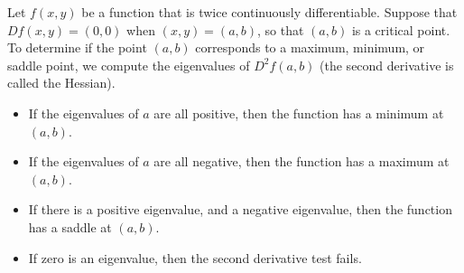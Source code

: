 \begin{theorem}
 Let $f(x,y)$ be a function that is twice continuously differentiable. Suppose that $Df(x,y)=(0,0)$ when $(x,y)=(a,b)$, so that $(a,b)$ is a critical point. To determine if the point $(a,b)$ corresponds to a maximum, minimum, or saddle point, we compute the eigenvalues of $D^2f(a,b)$ (the second derivative is called the Hessian).
\begin{itemize}
 \item If the eigenvalues of $a$ are all positive, then the function has a minimum at $(a,b)$. 
 \item If the eigenvalues of $a$ are all negative, then the function has a maximum at $(a,b)$. 
 \item If there is a positive eigenvalue, and a negative eigenvalue, then the function has a saddle at $(a,b)$. 
 \item If zero is an eigenvalue, then the second derivative test fails.
\end{itemize}
\end{theorem}

